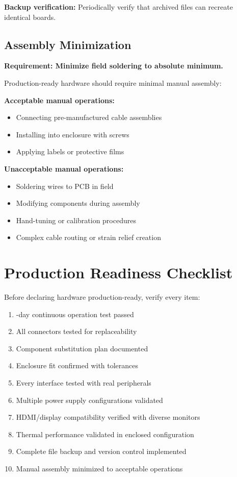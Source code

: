 \textbf{Backup verification:} Periodically verify that archived files can recreate identical boards.

\subsection{Assembly Minimization}

\textbf{Requirement: Minimize field soldering to absolute minimum.}

Production-ready hardware should require minimal manual assembly:

\textbf{Acceptable manual operations:}
\begin{itemize}
\item Connecting pre-manufactured cable assemblies
\item Installing into enclosure with screws
\item Applying labels or protective films
\end{itemize}

\textbf{Unacceptable manual operations:}
\begin{itemize}
\item Soldering wires to PCB in field
\item Modifying components during assembly
\item Hand-tuning or calibration procedures
\item Complex cable routing or strain relief creation
\end{itemize}

\section{Production Readiness Checklist}

Before declaring hardware production-ready, verify every item:

\begin{enumerate}
\item {}-day continuous operation test passed
\item \checkmark All connectors tested for replaceability
\item \checkmark Component substitution plan documented
\item \checkmark Enclosure fit confirmed with tolerances
\item \checkmark Every interface tested with real peripherals
\item \checkmark Multiple power supply configurations validated
\item \checkmark HDMI/display compatibility verified with diverse monitors
\item \checkmark Thermal performance validated in enclosed configuration
\item \checkmark Complete file backup and version control implemented
\item \checkmark Manual assembly minimized to acceptable operations
\end{enumerate}

